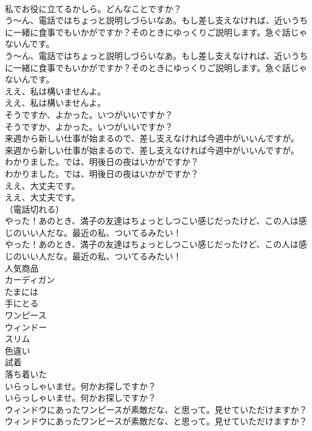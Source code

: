 \documentclass[8pt]{extreport}
\begin{document}
\begin{CJK}{UTF8}{min}
\\	私でお役に立てるかしら。どんなことですか？ 
\\	う～ん、電話ではちょっと説明しづらいなあ。もし差し支えなければ、近いうちに一緒に食事でもいかがですか？そのときにゆっくりご説明します。急ぐ話じゃないんです。	
\\	う～ん、電話ではちょっと説明しづらいなあ。もし差し支えなければ、近いうちに一緒に食事でもいかがですか？そのときにゆっくりご説明します。急ぐ話じゃないんです。 
\\	ええ、私は構いませんよ。	
\\	ええ、私は構いませんよ。 
\\	そうですか、よかった。いつがいいですか？	
\\	そうですか、よかった。いつがいいですか？ 
\\	来週から新しい仕事が始まるので、差し支えなければ今週中がいいんですが。	
\\	来週から新しい仕事が始まるので、差し支えなければ今週中がいいんですが。 
\\	わかりました。では、明後日の夜はいかがですか？	
\\	わかりました。では、明後日の夜はいかがですか？ 
\\	ええ、大丈夫です。	
\\	ええ、大丈夫です。 
\\	（電話切れる）	
\\	やった！あのとき、満子の友達はちょっとしつこい感じだったけど、この人は感じのいい人だな。最近の私、ついてるみたい！	
\\	やった！あのとき、満子の友達はちょっとしつこい感じだったけど、この人は感じのいい人だな。最近の私、ついてるみたい！ 
\\	人気商品
\\	カーディガン
\\	たまには
\\	手にとる
\\	ワンピース
\\	ウィンドー
\\	スリム
\\	色違い
\\	試着
\\	落ち着いた
\\	いらっしゃいませ。何かお探しですか？	
\\	いらっしゃいませ。何かお探しですか？ 
\\	ウィンドウにあったワンピースが素敵だな、と思って。見せていただけますか？	
\\	ウィンドウにあったワンピースが素敵だな、と思って。見せていただけますか？ 

\end{CJK}
\end{document}
